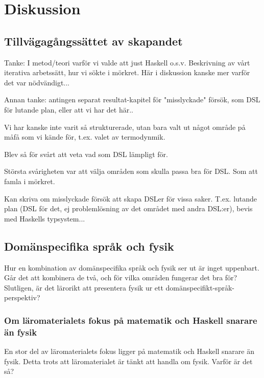
\chapter{Diskussion}

\begin{binge}
\section{Tillvägagångssättet av skapandet}

Tanke: I metod/teori varför vi valde att just Haskell o.s.v. Beskrivning av
vårt iterativa arbetssätt, hur vi sökte i mörkret. Här i diskussion kanske mer
varför det var nödvändigt...

Annan tanke: antingen separat resultat-kapitel för "misslyckade" försök, som
DSL för lutande plan, eller att vi har det här..

Vi har kanske inte varit så strukturerade, utan bara valt ut något område på
måfå som vi kände för, t.ex. valet av termodynmik.

Blev så för svårt att veta vad som DSL lämpligt för.

Största svårigheten var att välja områden som skulla passa bra för DSL. Som att
famla i mörkret.

Kan skriva om misslyckade försök att skapa DSLer för vissa saker. T.ex. lutande plan (DSL för det, ej problemlösning av det området med andra DSL:er), bevis med Haskells typsystem...

\section{Domänspecifika språk och fysik}

Hur en kombination av domänspecifika språk och fysik ser ut är inget uppenbart. Går det att kombinera de två, och för vilka områden fungerar det bra för? Slutligen, är det lärorikt att presentera fysik ur ett domänspecifikt-språk-perspektiv?

\subsection{Om läromaterialets fokus på matematik och Haskell snarare än fysik}

En stor del av läromaterialets fokus ligger på matematik och Haskell snarare än
fysik. Detta trots att läromaterialet är tänkt att handla om fysik. Varför är
det så?


\end{binge}
